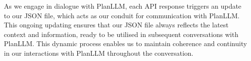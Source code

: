 \documentclass[runningheads]{llncs}
\begin{document}
As we engage in dialogue with PlanLLM, each API response triggers an update to our JSON file, which acts as our conduit for communication with PlanLLM. This ongoing updating ensures that our JSON file always reflects the latest context and information, ready to be utilised in subsequent conversations with PlanLLM. This dynamic process enables us to maintain coherence and continuity in our interactions with PlanLLM throughout the conversation.


\end{document}
